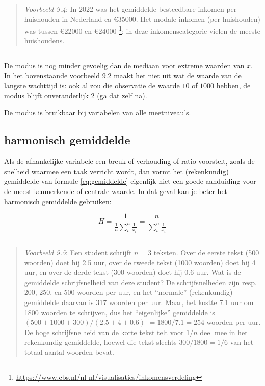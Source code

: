 \documentclass[
]{book}
\begin{document}
\begin{quote}
\emph{Voorbeeld 9.4}: In 2022 was het gemiddelde besteedbare inkomen per huishouden in Nederland ca €35000.
Het modale inkomen (per huishouden) was tussen €22000 en €24000 \footnote{\url{https://www.cbs.nl/nl-nl/visualisaties/inkomensverdeling}}: in deze inkomenscategorie vielen de meeste huishoudens.
\end{quote}

\begin{center}\rule{0.5\linewidth}{0.5pt}\end{center}

De modus is nog minder gevoelig dan de mediaan voor extreme waarden van
\(x\). In het bovenstaande voorbeeld 9.2 maakt het niet uit wat de waarde
van de langste wachttijd is: ook al zou die observatie de waarde \(10\) of
\(1000\) hebben, de modus blijft onveranderlijk \(2\) (ga dat zelf na).

De modus is bruikbaar bij variabelen van alle meetniveau's.

\subsection{harmonisch gemiddelde}\label{sec:harmonischgemiddelde}

Als de afhankelijke variabele een breuk of verhouding of ratio
voorstelt, zoals de snelheid waarmee een taak verricht wordt, dan vormt
het (rekenkundig) gemiddelde van formule \eqref{eq:gemiddelde}
eigenlijk niet een goede aanduiding voor de
meest kenmerkende of centrale waarde. In dat geval kan je beter het
harmonisch gemiddelde gebruiken:

\begin{equation}
  H = \frac{1}{\frac{1}{n} \sum\limits_{i}^n \frac{1}{x_i} } = \frac{n}{\sum\limits_{i}^n \frac{1}{x_i}}
  \label{eq:harmonischgemiddelde}
\end{equation}

\begin{center}\rule{0.5\linewidth}{0.5pt}\end{center}

\begin{quote}
\emph{Voorbeeld 9.5}:
Een student schrijft \(n=3\) teksten. Over de eerste tekst (500 woorden)
doet hij 2.5 uur, over de tweede tekst (1000 woorden) doet hij 4 uur, en
over de derde tekst (300 woorden) doet hij 0.6 uur. Wat is de gemiddelde
schrijfsnelheid van deze student? De schrijfsnelheden zijn resp. 200,
250, en 500 woorden per uur, en het ``normale'' (rekenkundig) gemiddelde
daarvan is 317 woorden per uur.
Maar, het kostte 7.1 uur om 1800 woorden te schrijven, dus
het ``eigenlijke'' gemiddelde is
\((500+1000+300)/(2.5+4+0.6)\) \(=1800/7.1=254\) woorden per uur. De hoge
schrijfsnelheid van de korte tekst telt voor \(1/n\) deel mee in het
rekenkundig gemiddelde, hoewel die tekst slechts \(300/1800=1/6\) van het
totaal aantal woorden bevat.
\end{quote}
\end{document}

